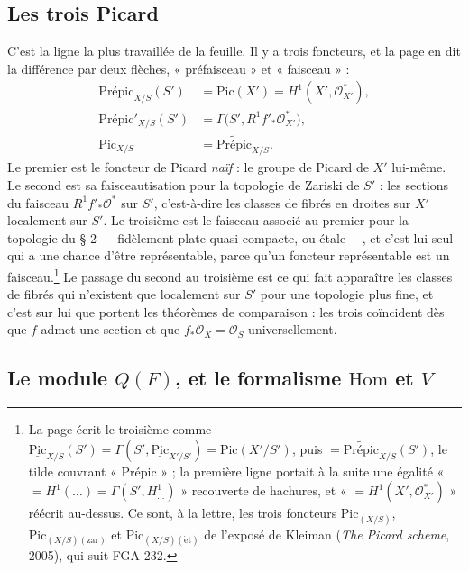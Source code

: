 \documentclass[11pt,a4paper]{article}
\begin{document}
\subsection*{Les trois Picard}

C'est la ligne la plus travaillée de la feuille. Il y a trois foncteurs, et
la page en dit la différence par deux flèches, « préfaisceau » et
« faisceau » :
\begin{align*}
  \text{Prépic}_{X/S}(S') &= \mathrm{Pic}(X') = H^{1}(X', \mathcal{O}_{X'}^{*}) , \\
  \text{Prépic}'_{X/S}(S') &= \Gamma\bigl(S', R^{1}f'_{*}\mathcal{O}_{X'}^{*}\bigr) , \\
  \mathrm{Pic}_{X/S} &= \widetilde{\text{Prépic}}_{X/S} .
\end{align*}
Le premier est le foncteur de Picard \emph{naïf} : le groupe de Picard de
$X'$ lui-même. Le second est sa faisceautisation pour la topologie de Zariski
de $S'$ : les sections du faisceau $R^{1}f'_{*}\mathcal{O}^{*}$ sur $S'$,
c'est-à-dire les classes de fibrés en droites sur $X'$ localement sur $S'$.
Le troisième est le faisceau associé au premier pour la topologie du § 2 —
fidèlement plate quasi-compacte, ou étale —, et c'est lui seul qui a une
chance d'être représentable, parce qu'un foncteur représentable est un
faisceau.\footnote{La page écrit le troisième comme
$\underline{\mathrm{Pic}}_{X/S}(S') = \Gamma(S', \underline{\mathrm{Pic}}_{X'/S'})
= \mathrm{Pic}(X'/S')$, puis $= \widetilde{\text{Prépic}}_{X/S}(S')$,
le tilde couvrant « Prépic » ; la première ligne portait à la suite une
égalité « $= H^1(\ldots) = \Gamma(S', H^1_{\ldots})$ » recouverte de hachures,
et « $= H^1(X', \mathcal{O}_{X'}^{*})$ » réécrit au-dessus. Ce sont, à la
lettre, les trois foncteurs $\mathrm{Pic}_{(X/S)}$, $\mathrm{Pic}_{(X/S)(\mathrm{zar})}$
et $\mathrm{Pic}_{(X/S)(\mathrm{\acute{e}t})}$ de l'exposé de Kleiman
(\emph{The Picard scheme}, 2005), qui suit FGA 232.} Le passage du second au
troisième est ce qui fait apparaître les classes de fibrés qui n'existent
que localement sur $S'$ pour une topologie plus fine, et c'est sur lui que
portent les théorèmes de comparaison : les trois coïncident dès que $f$ admet
une section et que $f_{*}\mathcal{O}_X = \mathcal{O}_S$ universellement.

\subsection*{Le module $Q(F)$, et le formalisme $\mathrm{Hom}$ et $V$}
\end{document}
